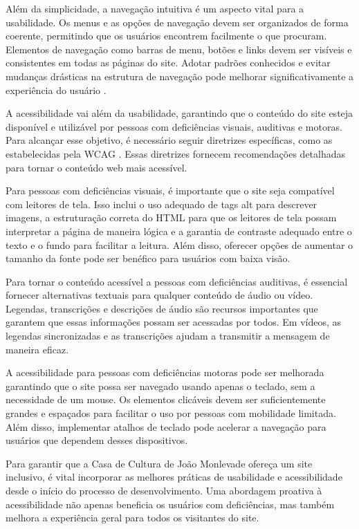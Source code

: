 Além da simplicidade, a navegação intuitiva é um aspecto vital para a usabilidade. Os menus e as opções de navegação devem ser organizados de forma coerente, permitindo que os usuários encontrem facilmente o que procuram. Elementos de navegação como barras de menu, botões e links devem ser visíveis e consistentes em todas as páginas do site. Adotar padrões conhecidos e evitar mudanças drásticas na estrutura de navegação pode melhorar significativamente a experiência do usuário \cite{islam2016towards}.

A acessibilidade vai além da usabilidade, garantindo que o conteúdo do site esteja disponível e utilizável por pessoas com deficiências visuais, auditivas e motoras. Para alcançar esse objetivo, é necessário seguir diretrizes específicas, como as estabelecidas pela \ac{WCAG} \cite{wcag2020}. Essas diretrizes fornecem recomendações detalhadas para tornar o conteúdo web mais acessível.

Para pessoas com deficiências visuais, é importante que o site seja compatível com leitores de tela. Isso inclui o uso adequado de tags alt para descrever imagens, a estruturação correta do \ac{HTML} para que os leitores de tela possam interpretar a página de maneira lógica e a garantia de contraste adequado entre o texto e o fundo para facilitar a leitura. Além disso, oferecer opções de aumentar o tamanho da fonte pode ser benéfico para usuários com baixa visão.

Para tornar o conteúdo acessível a pessoas com deficiências auditivas, é essencial fornecer alternativas textuais para qualquer conteúdo de áudio ou vídeo. Legendas, transcrições e descrições de áudio são recursos importantes que garantem que essas informações possam ser acessadas por todos. Em vídeos, as legendas sincronizadas e as transcrições ajudam a transmitir a mensagem de maneira eficaz.

A acessibilidade para pessoas com deficiências motoras pode ser melhorada garantindo que o site possa ser navegado usando apenas o teclado, sem a necessidade de um mouse. Os elementos clicáveis devem ser suficientemente grandes e espaçados para facilitar o uso por pessoas com mobilidade limitada. Além disso, implementar atalhos de teclado pode acelerar a navegação para usuários que dependem desses dispositivos.

Para garantir que a Casa de Cultura de João Monlevade ofereça um site inclusivo, é vital incorporar as melhores práticas de usabilidade e acessibilidade desde o início do processo de desenvolvimento. Uma abordagem proativa à acessibilidade não apenas beneficia os usuários com deficiências, mas também melhora a experiência geral para todos os visitantes do site.

